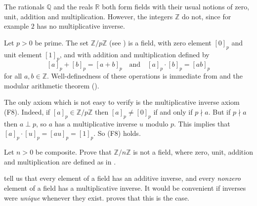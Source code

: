 \begin{example}
The rationals $\mathbb{Q}$ and the reals $\mathbb{R}$ both form fields with their usual notions of zero, unit, addition and multiplication. However, the integers $\mathbb{Z}$ do not, since for example $2$ has no multiplicative inverse.
\end{example}

\begin{example}
\label{exZpZIsField}
Let $p>0$ be prime. The set $\mathbb{Z}/p\mathbb{Z}$ (see ) is a field, with zero element $[0]_p$ and unit element $[1]_p$, and with addition and multiplication defined by
\[ [a]_p+[b]_p=[a+b]_p \quad \text{and} \quad [a]_p \cdot [b]_p = [ab]_p \]
for all $a,b \in \mathbb{Z}$. Well-definedness of these operations is immediate from  and the modular arithmetic theorem ().

The only axiom which is not easy to verify is the multiplicative inverse axiom (F8). Indeed, if $[a]_p \in \mathbb{Z}/p\mathbb{Z}$ then $[a]_p \ne [0]_p$ if and only if $p \nmid a$. But if $p \nmid a$ then $a \perp p$, so $a$ has a multiplicative inverse $u$ modulo $p$. This implies that $[a]_p \cdot [u]_p = [au]_p = [1]_p$. So (F8) holds.
\end{example}

\begin{exercise}
Let $n > 0$ be composite. Prove that $\mathbb{Z}/n\mathbb{Z}$ is not a field, where zero, unit, addition and multiplication are defined as in .
\end{exercise}

 tell us that every element of a field has an additive inverse, and every \textit{nonzero} element of a field has a multiplicative inverse. It would be convenient if inverses were \textit{unique} whenever they exist.  proves that this is the case.

